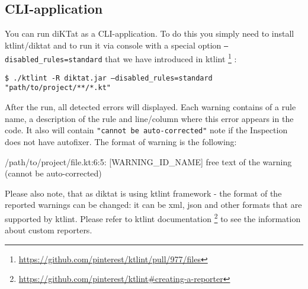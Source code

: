 \subsection{CLI-application}
You can run diKTat as a CLI-application. To do this you simply need to install ktlint/diktat and to run it via console with a special option \texttt{--disabled\_rules=standard} that we have introduced in ktlint \footnote{\url{https://github.com/pinterest/ktlint/pull/977/files}} :

\begin{center}
\texttt{\$ ./ktlint -R diktat.jar --disabled\_rules=standard "path/to/project/**/*.kt"}
\end{center}

After the run, all detected errors will displayed. Each warning contains of a rule name, a description of the rule and line/column where this error appears in the code. It also will contain \texttt{"cannot be auto-corrected"} note if the Inspection does not have autofixer. The format of warning is the following:

\begin{center}
/path/to/project/file.kt:6:5: [WARNING\_ID\_NAME] free text of the warning (cannot be auto-corrected)
\end{center}

Please also note, that as diktat is using ktlint framework - the format of the reported warnings can be changed: it can be xml, json and other formats that are supported by ktlint. Please refer to ktlint documentation \footnote{\url{https://github.com/pinterest/ktlint\#creating-a-reporter}} to see the information about custom reporters. 

